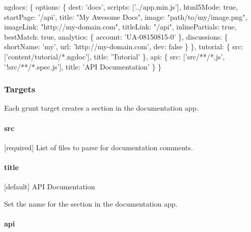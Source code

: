 \begin{DoxyCode}
ngdocs: \{
  options: \{
    dest: \textcolor{stringliteral}{'docs'},
    scripts: [\textcolor{stringliteral}{'../app.min.js'}],
    html5Mode: \textcolor{keyword}{true},
    startPage: \textcolor{stringliteral}{'/api'},
    title: \textcolor{stringliteral}{"My Awesome Docs"},
    image: \textcolor{stringliteral}{"path/to/my/image.png"},
    imageLink: \textcolor{stringliteral}{"http://my-domain.com"},
    titleLink: \textcolor{stringliteral}{"/api"},
    inlinePartials: \textcolor{keyword}{true},
    bestMatch: \textcolor{keyword}{true},
    analytics: \{
          account: \textcolor{stringliteral}{'UA-08150815-0'}
    \},
    discussions: \{
          shortName: \textcolor{stringliteral}{'my'},
          url: \textcolor{stringliteral}{'http://my-domain.com'},
          dev: \textcolor{keyword}{false}
    \}
  \},
  tutorial: \{
    src: [\textcolor{stringliteral}{'content/tutorial/*.ngdoc'}],
    title: \textcolor{stringliteral}{'Tutorial'}
  \},
  api: \{
    src: [\textcolor{stringliteral}{'src/**/*.js'}, \textcolor{stringliteral}{'!src/**/*.spec.js'}],
    title: \textcolor{stringliteral}{'API Documentation'}
  \}
\}
\end{DoxyCode}


\subsubsection*{Targets}

Each grunt target creates a section in the documentation app.

\paragraph*{src}

\mbox{[}required\mbox{]} List of files to parse for documentation comments.

\paragraph*{title}

\mbox{[}default\mbox{]} \textquotesingle{}A\+P\+I Documentation\textquotesingle{}

Set the name for the section in the documentation app.

\paragraph*{api}


